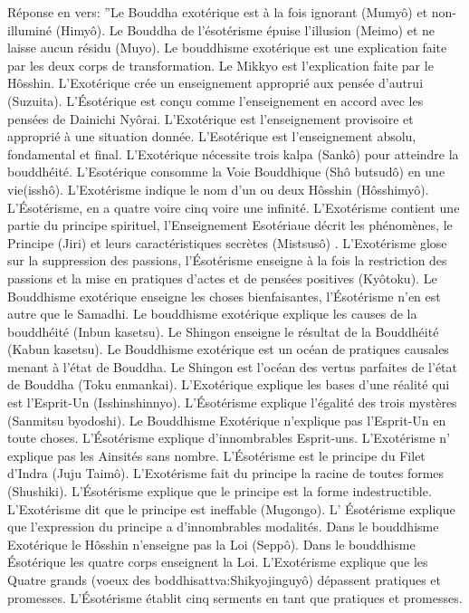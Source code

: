Réponse en vers:
”Le Bouddha exotérique est à la fois ignorant (Mumyô) et non-illuminé (Himyô).
Le Bouddha de l’ésotérisme épuise l’illusion (Meimo) et ne laisse aucun résidu (Muyo).
Le bouddhisme exotérique est une explication faite par les deux corps de transformation.
Le Mikkyo est l’explication faite par le Hôsshin.
L’Exotérique crée un enseignement approprié aux pensée d’autrui (Suzuita).
L'Ésotérique est conçu comme l’enseignement en accord avec les pensées de Dainichi Nyôrai.
L’Exotérique est l’enseignement provisoire et approprié à une situation donnée.
L’Esotérique est l’enseignement absolu, fondamental et final.
L’Exotérique nécessite trois kalpa (Sankô) pour atteindre la bouddhéité.
L’Esotérique consomme la Voie Bouddhique (Shô butsudô) en une vie(isshô).
L’Exotérisme indique le nom d’un ou deux Hôsshin (Hôsshimyô).
L’Ésotérisme, en a quatre voire cinq voire une infinité.
L’Exotérisme contient une partie du principe spirituel, 
l’Enseignement Esotériaue décrit les phénomènes, le Principe (Jiri) et leurs caractéristiques secrètes (Mistsusô) .
L’Exotérisme glose sur la suppression des passions, 
l'Ésotérisme enseigne à la fois la restriction des passions et la mise en pratiques d’actes et de pensées positives (Kyôtoku).
Le Bouddhisme exotérique enseigne les choses bienfaisantes, l'Ésotérisme n’en est  autre que le Samadhi.
Le bouddhisme exotérique explique les causes de la bouddhéité (Inbun kasetsu).
Le Shingon enseigne le résultat de la Bouddhéité (Kabun kasetsu).
Le Bouddhisme exotérique est un océan de pratiques causales menant à l'état de Bouddha.
Le Shingon est l’océan des vertus parfaites de l'état de Bouddha (Toku enmankai).
L’Exotérique explique les bases d’une réalité qui est l’Esprit-Un (Isshinshinnyo).
L’Ésotérisme explique l’égalité des trois mystères (Sanmitsu byodoshi).
Le Bouddhisme Exotérique n’explique pas l’Esprit-Un en toute choses.
L’Ésotérisme explique d’innombrables Esprit-uns.
L’Exotérisme n’ explique pas les Ainsités sans nombre.
L’Ésotérisme est le principe du Filet d’Indra (Juju Taimô).
L’Exotérisme fait du principe la racine de toutes formes (Shushiki).
L’Ésotérisme explique que le principe est la forme indestructible.
L'Exotérisme dit que le principe est ineffable (Mugongo).
L’ Ésotérisme explique que l'expression du principe a d'innombrables modalités.
Dans le bouddhisme Exotérique le Hôsshin n’enseigne pas la Loi (Seppô).
Dans le bouddhisme Ésotérique les quatre corps enseignent la Loi.
L’Exotérisme explique que les Quatre grands (voeux des boddhisattva:Shikyojinguyô) dépassent pratiques et promesses.
L’Ésotérisme établit cinq serments en tant que pratiques et promesses.

